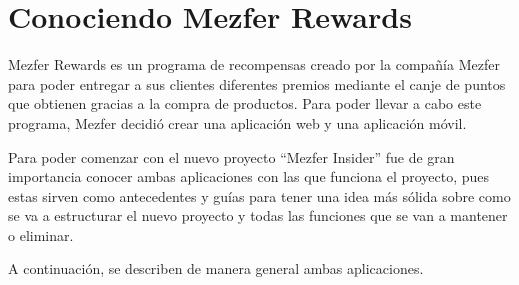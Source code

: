 \section{Conociendo Mezfer Rewards}
Mezfer Rewards es un programa de recompensas creado por la compañía Mezfer para poder entregar a sus clientes diferentes premios mediante el canje de puntos que obtienen gracias a la compra de productos. Para poder llevar a cabo este programa, Mezfer decidió crear una aplicación web y una aplicación móvil.

Para poder comenzar con el nuevo proyecto ``Mezfer Insider'' fue de gran importancia conocer ambas aplicaciones con las que funciona el proyecto, pues estas sirven como antecedentes y guías para tener una idea más sólida sobre como se va a estructurar el nuevo proyecto y todas las funciones que se van a mantener o eliminar. 

A continuación, se describen de manera general ambas aplicaciones.
    
    